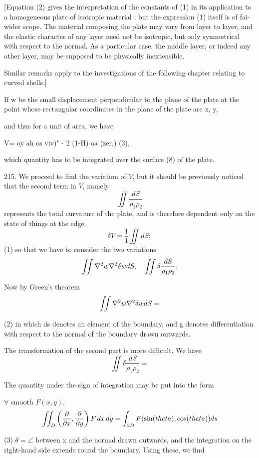 [Equation (2) gives the interpretation of the constants of (1)
in its application to a homogeneous plate of isotropic material ;
but the expression (1) itself is of fai- wider scope. The material
composing the plate may vary from layer to layer, and the elastic
character of any layer need not be isotropic, but only symmetrical
with respect to the normal. As a particular case, the middle
layer, or indeed any other layer, may be supposed to be physically
inextensible.

Similar remarks apply to the investigations of the following
chapter relating to curved shells.]

If w be the small displacement perpendicular to the plane of the plate
at the point whose rectangular coordinates in the plane of the plate are
x, y,

and thus for a unit of area, we have

V= oy ah os viv)" - 2 (1-H) oa (zer,) (3),

which quantity has to be integrated over the surface (8) of the plate.

215. We proceed to find the variation of \(V\), but it should be previously
noticed that the second term in \(V\), namely
\[
\iint \frac{ dS }{ \rho_1 \rho_2 }
\]
represents the total curvature of the plate, and is therefore dependent
only on the state of things at the edge.
\[ \delta V = \frac{1}{1} \iint dS;\]
(1) so that we have to consider the two variations
\[\iint \nabla^2 w \nabla^2 \delta w dS,\quad \iint \delta \frac{ dS }{ \rho_1 \rho_2 }.\]

Now by Green's theorem
\[\iint \nabla^2 w \nabla^2 \delta w dS=
\]

(2) in which ds denotes an element of the boundary, and g denotes
differentiation with respect to the normal of the boundary drawn
outwards.

The transformation of the second part is more difficult. We have
\[\iint \delta \frac{ dS }{ \rho_1 \rho_2 }=\]

The quantity under the sign of integration may be put into the form

\(\forall\) smooth \(F(x,y)\),
\begin{equation}
\iint_D \left(\frac{\partial}{\partial x},\frac{\partial}{\partial y}\right)F \, dx \, dy=
\int_{\partial D} F (\sin(theta), \cos(theta)) ds
\end{equation}

(3) \(\theta = \angle \) between x and the normal drawn outwards, and the
integration on the right-hand side extends round the boundary. Using
these, we find

